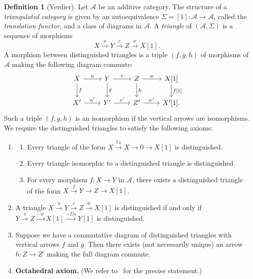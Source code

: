 \documentclass[12pt,a4paper]{article}
\theoremstyle{definition}
\newtheorem{definition}[theorem]{Definition}
\begin{document}
\begin{definition}[Verdier]\label{def:triangulated}
Let $\mathcal{A}$ be an additive category.  The structure of a \emph{triangulated
category} is given by an autoequivalence $\Sigma=[1]:\mathcal{A}\to\mathcal{A}$,
called the \emph{translation functor}, and a class of diagrams in $\mathcal{A}$.
A \emph{triangle} of $(\mathcal{A},\Sigma)$ is a sequence of morphisms
\[
  X \xrightarrow{u} Y \xrightarrow{v} Z \xrightarrow{w} X[1].
\]
A morphism between distinguished triangles is a triple $(f,g,h)$ of morphisms of
$\mathcal{A}$ making the following diagram commute:
\[
\begin{tikzcd}
  X \ar[r,"u"] \ar[d,"f"] & Y \ar[r,"v"] \ar[d,"g"] & Z \ar[r,"w"] \ar[d,"h"] & X[1] \ar[d,"f{[1]}"]\\
  X' \ar[r,"u'"] & Y' \ar[r,"v'"] & Z' \ar[r,"w'"] & X'[1].
\end{tikzcd}
\]
Such a triple $(f,g,h)$ is an isomorphism if the vertical arrows are isomorphisms.
We require the distinguished triangles to satisfy the following axioms:
\begin{enumerate}[label=\textup{(TR\arabic*)}]
  \item\label{TR1}
    \begin{enumerate}[label=(\alph*)]
      \item Every triangle of the form $X\xrightarrow{1_X} X\to 0\to X[1]$ is
        distinguished.
      \item Every triangle isomorphic to a distinguished triangle is distinguished.
      \item For every morphism $f:X\to Y$ in $\mathcal{A}$, there exists a
        distinguished triangle of the form
        $X\xrightarrow{f} Y \to Z \to X[1]$.
    \end{enumerate}
  \item\label{TR2}
    A triangle $X\xrightarrow{u} Y\xrightarrow{v} Z\xrightarrow{w} X[1]$ is
    distinguished if and only if
    $Y\xrightarrow{v} Z\xrightarrow{-w} X[1]\xrightarrow{-\Sigma u} Y[1]$
    is distinguished.
  \item\label{TR3}
    Suppose we have a commutative diagram of distinguished triangles with vertical
    arrows $f$ and $g$.  Then there exists (not necessarily unique) an arrow
    $h:Z\to Z'$ making the full diagram commute.
  \item\label{TR4} \textbf{Octahedral axiom.}
    (We refer to~\cite{BBD} for the precise statement.)
\end{enumerate}
\end{definition}
\end{document}
